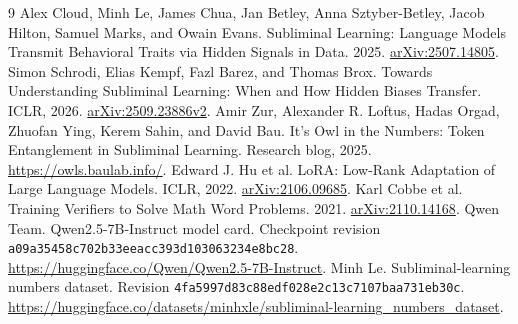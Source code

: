\begin{thebibliography}{9}
\small
{} Alex Cloud, Minh Le, James Chua, Jan Betley, Anna Sztyber-Betley, Jacob Hilton, Samuel Marks, and Owain Evans. Subliminal Learning: Language Models Transmit Behavioral Traits via Hidden Signals in Data. 2025. \href{https://arxiv.org/abs/2507.14805}{arXiv:2507.14805}.
 Simon Schrodi, Elias Kempf, Fazl Barez, and Thomas Brox. Towards Understanding Subliminal Learning: When and How Hidden Biases Transfer. ICLR, 2026. \href{https://arxiv.org/abs/2509.23886v2}{arXiv:2509.23886v2}.
 Amir Zur, Alexander R. Loftus, Hadas Orgad, Zhuofan Ying, Kerem Sahin, and David Bau. It's Owl in the Numbers: Token Entanglement in Subliminal Learning. Research blog, 2025. \url{https://owls.baulab.info/}.
 Edward J. Hu et al. LoRA: Low-Rank Adaptation of Large Language Models. ICLR, 2022. \href{https://arxiv.org/abs/2106.09685}{arXiv:2106.09685}.
 Karl Cobbe et al. Training Verifiers to Solve Math Word Problems. 2021. \href{https://arxiv.org/abs/2110.14168}{arXiv:2110.14168}.
 Qwen Team. Qwen2.5-7B-Instruct model card. Checkpoint revision \texttt{a09a35458c702b33eeacc393d103063234e8bc28}. \url{https://huggingface.co/Qwen/Qwen2.5-7B-Instruct}.
 Minh Le. Subliminal-learning numbers dataset. Revision \texttt{4fa5997d83c88edf028e2c13c7107baa731eb30c}. \url{https://huggingface.co/datasets/minhxle/subliminal-learning_numbers_dataset}.
\end{thebibliography}
